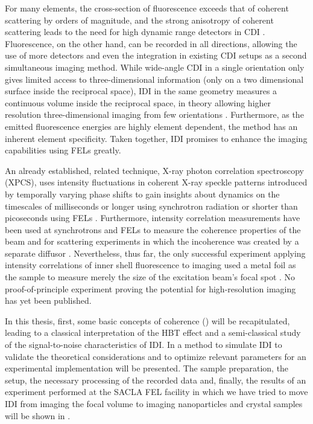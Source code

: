 For many elements, the cross-section of fluorescence exceeds that of coherent scattering by orders of magnitude, and the strong anisotropy of coherent scattering leads to the need for high dynamic range detectors in CDI \cite{xraylib,attwood1999}.  Fluorescence, on the other hand, can be recorded in all directions, allowing the use of more detectors and even the integration in existing CDI setups as a second simultaneous imaging method. While wide-angle CDI in a single orientation only gives limited access to three-dimensional information  (only on a two dimensional surface inside the reciprocal space), IDI in the same geometry measures a continuous volume inside the reciprocal space, in theory allowing higher resolution three-dimensional imaging from few orientations \cite{barke2015,classen2017}. Furthermore, as the emitted fluorescence energies are highly element dependent, the method has an inherent element specificity. Taken together, IDI promises to enhance the imaging capabilities using FELs  greatly.

An already established, related technique, X-ray photon correlation spectroscopy (XPCS), uses intensity fluctuations in coherent X-ray speckle patterns introduced by temporally varying phase shifts to gain insights about dynamics on the timescales of milliseconds or longer using synchrotron radiation or shorter than picoseconds using FELs \cite{lehmkuhler2021,grubel2007}. Furthermore, intensity correlation measurements have been used at synchrotrons and FELs to measure the coherence properties of the beam and for scattering experiments in which the incoherence was created by a separate diffusor \cite{yabashi2002,singer2013,inoue2019,gorobtsov2018,schneider2018}.  Nevertheless, thus far, the only successful experiment applying intensity correlations of inner shell fluorescence to imaging used a metal foil as the sample to measure merely the size of the excitation beam's focal spot \cite{nakumura2020}. No proof-of-principle experiment proving the potential for high-resolution imaging has yet been published. 

In this thesis, first, some basic concepts of coherence () will be recapitulated, leading to a classical interpretation of the HBT effect and a semi-classical study of the signal-to-noise characteristics of IDI. In  a method to simulate IDI to validate the theoretical considerations and to optimize relevant parameters for an experimental implementation will be presented. The sample preparation, the setup, the necessary processing of the recorded data and, finally, the results of an experiment performed at the SACLA FEL facility in which we have tried to move IDI from imaging the focal volume to imaging nanoparticles and crystal samples will be shown in .

\cleardoublepage

